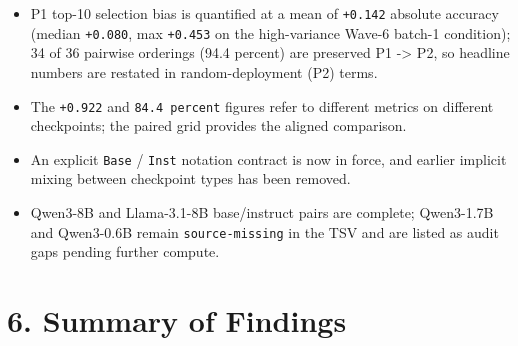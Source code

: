 \documentclass[
  american,
  11pt,
  a4paper,
  oneside]{report}
\providecommand{\tightlist}{%
  \setlength{\itemsep}{0pt}\setlength{\parskip}{0pt}}
\begin{document}
\begin{itemize}
\tightlist
\item
  P1 top-10 selection bias is quantified at a mean of \texttt{+0.142}
  absolute accuracy (median \texttt{+0.080}, max \texttt{+0.453} on the
  high-variance Wave-6 batch-1 condition); 34 of 36 pairwise orderings
  (94.4 percent) are preserved P1 -\textgreater{} P2, so headline
  numbers are restated in random-deployment (P2) terms.
\item
  The \texttt{+0.922} and \texttt{84.4\ percent} figures refer to
  different metrics on different checkpoints; the paired grid provides
  the aligned comparison.
\item
  An explicit \texttt{Base} / \texttt{Inst} notation contract is now in
  force, and earlier implicit mixing between checkpoint types has been
  removed.
\item
  Qwen3-8B and Llama-3.1-8B base/instruct pairs are complete; Qwen3-1.7B
  and Qwen3-0.6B remain \texttt{source-missing} in the TSV and are
  listed as audit gaps pending further compute.
\end{itemize}

\chapter{6. Summary of Findings}\label{summary-of-findings}
\end{document}
